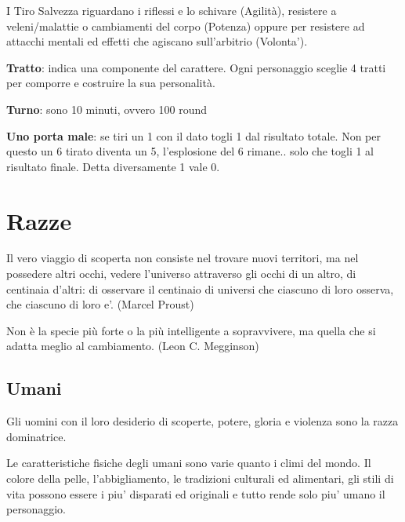 \documentclass[a4paper,11pt,twoside,openany]{book}
\begin{document}
I Tiro Salvezza riguardano i riflessi e lo schivare (Agilità), resistere a veleni/malattie o cambiamenti del corpo (Potenza) oppure per resistere ad attacchi mentali ed effetti che agiscano sull'arbitrio (Volonta').

\textbf{Tratto}: indica una componente del carattere. Ogni personaggio sceglie 4 tratti per comporre e costruire la sua personalità.

\textbf{Turno}: sono 10 minuti, ovvero 100 round

\textbf{Uno porta male}: se tiri un 1 con il dato togli 1 dal risultato totale. Non per questo un 6 tirato diventa un 5, l’esplosione del 6 rimane.. solo che togli 1 al risultato finale. Detta diversamente 1 vale 0.



\pagebreak

\section{Razze}
\begin{tcolorbox}[enhanced,arc=5pt,boxrule=0.3pt]{Il vero viaggio di scoperta non consiste nel trovare nuovi territori, ma nel possedere altri occhi, vedere l'universo attraverso gli occhi di un altro, di centinaia d'altri: di osservare il centinaio di universi che ciascuno di loro osserva, che ciascuno di loro e'. (Marcel Proust)}\end{tcolorbox}\medskip


\begin{tcolorbox}[enhanced,arc=5pt,boxrule=0.3pt]{Non è la specie più forte o la più intelligente a sopravvivere, ma quella che si adatta meglio al cambiamento. (Leon C. Megginson)}\end{tcolorbox}\medskip

\subsection{Umani}

Gli uomini con il loro desiderio di scoperte, potere, gloria e violenza sono la razza dominatrice.

Le caratteristiche fisiche degli umani sono varie quanto i climi del mondo. Il colore della pelle, l'abbigliamento, le tradizioni culturali ed alimentari, gli stili di vita possono essere i piu' disparati ed originali e tutto rende solo piu' umano il personaggio.
\end{document}
